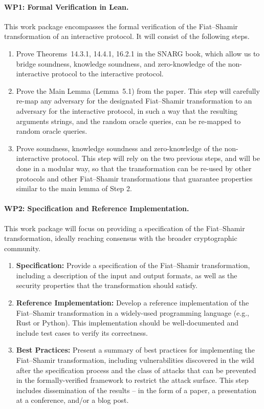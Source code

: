 \documentclass{article}
\begin{document}
\paragraph{WP1: Formal Verification in Lean.}
This work package encompasses the formal verification of the Fiat--Shamir transformation of an interactive protocol. It will consist of the following steps.
\begin{enumerate}[label=\textbf{Step \arabic*:}, leftmargin=*, itemsep=0.5em]
    \item Prove Theorems~14.3.1, 14.4.1, 16.2.1 in the SNARG book, which allow us to bridge soundness, knowledge soundness, and zero-knowledge of the non-interactive protocol to the interactive protocol.
    \item Prove the Main Lemma (Lemma~5.1) from the paper. This step will carefully re-map any adversary for the designated Fiat--Shamir transformation to an adversary for the interactive protocol, in such a way that the resulting arguments strings, and the random oracle queries, can be re-mapped to random oracle queries.
    \item Prove soundness, knowledge soundness and zero-knowledge of the non-interactive protocol. This step will rely on the two previous steps, and will be done in a modular way, so that the transformation can be re-used by other protocols and other Fiat--Shamir transformations that guarantee properties similar to the main lemma of Step 2.
\end{enumerate}
\paragraph{WP2: Specification and Reference Implementation. }
This work package will focus on providing a specification of the Fiat--Shamir transformation, ideally reaching consensus with the broader cryptographic community.
\begin{enumerate}[label=\textbf{Step \arabic*:}, leftmargin=*, itemsep=0.5em]

    \item \textbf{Specification:} Provide a specification of the Fiat--Shamir transformation, including a description of the input and output formats, as well as the security properties that the transformation should satisfy.
    \item \textbf{Reference Implementation:} Develop a reference implementation of the Fiat--Shamir transformation in a widely-used programming language (e.g., Rust or Python). This implementation should be well-documented and include test cases to verify its correctness.
    \item \textbf{Best Practices:} Present a summary of best practices for implementing the Fiat--Shamir transformation, including vulnerabilities discovered in the wild after the specification process and the class of attacks that can be prevented in the formally-verified framework to restrict the attack surface. This step includes dissemination of the results  -- in the form of a paper, a presentation at a conference, and/or a blog post.
\end{enumerate}
\end{document}
